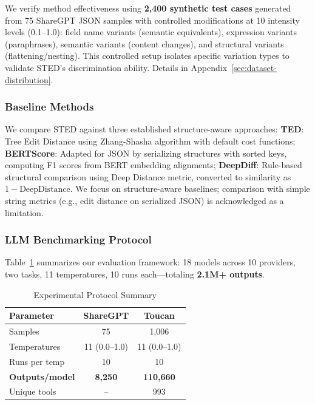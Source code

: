 \documentclass{article}
\theoremstyle{plain}
\theoremstyle{definition}
\begin{document}
We verify method effectiveness using \textbf{2,400 synthetic test cases} generated from 75 ShareGPT JSON samples with controlled modifications at 10 intensity levels (0.1--1.0): field name variants (semantic equivalents), expression variants (paraphrases), semantic variants (content changes), and structural variants (flattening/nesting). This controlled setup isolates specific variation types to validate STED's discrimination ability. Details in Appendix~\ref{sec:dataset-distribution}.

\subsubsection{Baseline Methods}

We compare STED against three established structure-aware approaches: \textbf{TED}: Tree Edit Distance using Zhang-Shasha algorithm with default cost functions; \textbf{BERTScore}: Adapted for JSON by serializing structures with sorted keys, computing F1 scores from BERT embedding alignments; \textbf{DeepDiff}: Rule-based structural comparison using Deep Distance metric, converted to similarity as $1 - \text{DeepDistance}$. We focus on structure-aware baselines; comparison with simple string metrics (e.g., edit distance on serialized JSON) is acknowledged as a limitation.

\subsubsection{LLM Benchmarking Protocol}

Table~\ref{tab:experimental-protocol} summarizes our evaluation framework: 18 models across 10 providers, two tasks, 11 temperatures, 10 runs each---totaling \textbf{2.1M+ outputs}.

\begin{table}[h]
\centering
\caption{Experimental Protocol Summary}
\label{tab:experimental-protocol}
\scriptsize
\begin{tabular}{@{}lcc@{}}
\toprule
\textbf{Parameter} & \textbf{ShareGPT} & \textbf{Toucan} \\
\midrule
Samples & 75 & 1,006 \\
Temperatures & 11 (0.0--1.0) & 11 (0.0--1.0) \\
Runs per temp & 10 & 10 \\
\textbf{Outputs/model} & \textbf{8,250} & \textbf{110,660} \\
Unique tools & -- & 993 \\
\bottomrule
\end{tabular}
\end{table}
\end{document}
